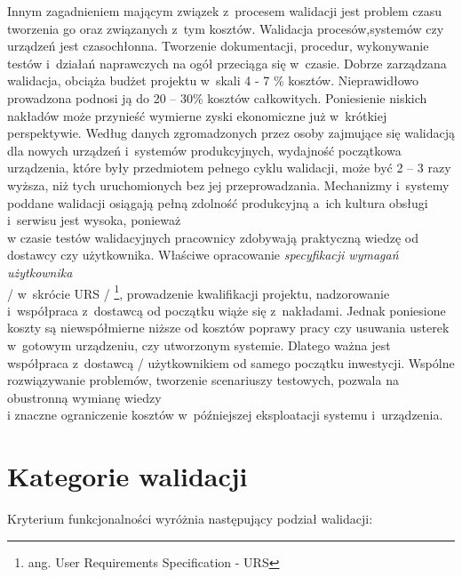 \documentclass[brudnopis]{xmgr}
\begin{document}
\indent \textcolor{sb}{Innym zagadnieniem mającym związek z~procesem walidacji jest problem czasu tworzenia go oraz związanych z~tym kosztów.} \textcolor{sa}{Walidacja procesów,systemów czy urządzeń jest czasochłonna. Tworzenie dokumentacji, procedur, wykonywanie testów i~działań naprawczych na ogół przeciąga się w~czasie.} \textcolor{sb}{Dobrze zarządzana walidacja, obciąża budżet projektu w~skali 4 - 7 \% kosztów.} \textcolor{sa}{Nieprawidłowo prowadzona podnosi ją do 20 – 30\% kosztów całkowitych.} \textcolor{sb}{Poniesienie niskich nakładów może przynieść wymierne zyski ekonomiczne już w~krótkiej perspektywie.} \textcolor{sa}{Według danych zgromadzonych przez osoby zajmujące się walidacją dla nowych urządzeń i~systemów produkcyjnych, wydajność początkowa urządzenia, które były przedmiotem pełnego cyklu walidacji, może być 2 – 3 razy wyższa, niż tych uruchomionych bez jej przeprowadzania.} \textcolor{sb}{Mechanizmy i~systemy poddane walidacji osiągają pełną zdolność produkcyjną a~ich kultura obsługi i~serwisu jest wysoka,} \textcolor{sa}{ponieważ
\\
w czasie testów walidacyjnych pracownicy zdobywają praktyczną wiedzę od dostawcy czy użytkownika.} \textcolor{sb}{Właściwe opracowanie \textit{specyfikacji wymagań użytkownika}
\\
/ w~skrócie URS / \footnote{ang. User Requirements Specification - URS}, prowadzenie kwalifikacji projektu, nadzorowanie i~współpraca z~dostawcą} \textcolor{sa}{od początku wiąże się z~nakładami.} \textcolor{sb}{Jednak poniesione koszty są niewspółmierne niższe od kosztów poprawy pracy czy usuwania usterek w~gotowym urządzeniu, czy utworzonym systemie.} \textcolor{sa}{Dlatego ważna jest współpraca z~dostawcą / użytkownikiem  od samego początku inwestycji.} \textcolor{sb}{Wspólne rozwiązywanie problemów, tworzenie scenariuszy testowych,} \textcolor{sa}{pozwala na obustronną wymianę wiedzy
\\
i znaczne ograniczenie kosztów w~późniejszej eksploatacji systemu i~urządzenia.}\cite{ekonomia}

\section{Kategorie walidacji}

\textcolor{sb}{Kryterium funkcjonalności wyróżnia następujący podział walidacji:}
\end{document}
